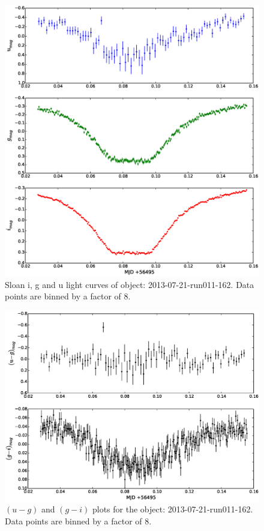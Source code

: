 \begin{figure}
  \center
  \includegraphics[width=120mm]{images/2013-07-21-run011-162_lightcurve-bin8.eps}
  \caption{Sloan i, g and u light curves of object: 2013-07-21-run011-162. Data points are binned by a factor of 8.}
  \label{fig:2013-07-21-run011-162}
\end{figure}

\begin{figure}
  \center
  \includegraphics[width=120mm]{images/2013-07-21-run011-162_colourcurve-bin8.eps}
  \caption{$(u - g)$ and $(g - i)$ plots for the object: 2013-07-21-run011-162. Data points are binned by a factor of 8.}
  \label{fig:2013-07-21-run011-162-colour}
\end{figure} 

